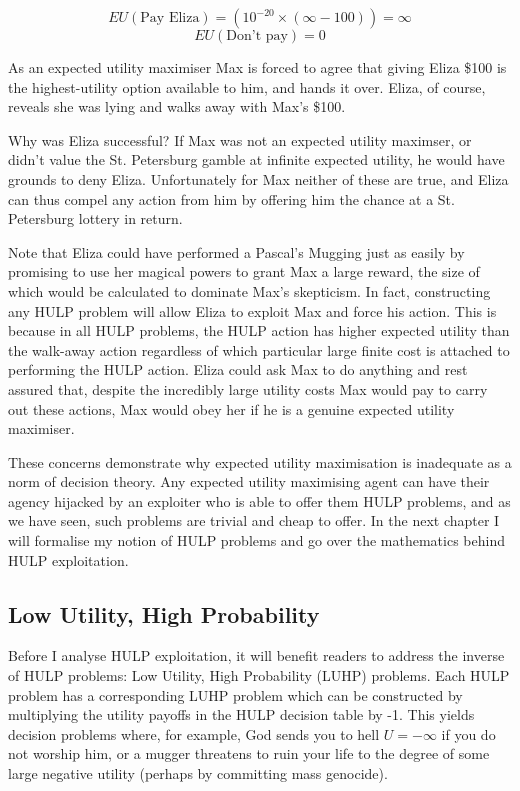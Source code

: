 \documentclass{article}
\begin{document}
\[EU(\mbox{Pay Eliza})=(10^{-20}\times(\infty-100)) = \infty\]
\[EU(\mbox{Don't pay})=0\]

As an expected utility maximiser Max is forced to agree that giving Eliza \$100 is the highest-utility option available to him, and hands it over. Eliza, of course, reveals she was lying and walks away with Max's \$100.

Why was Eliza successful? If Max was not an expected utility maximser, or didn't value the St. Petersburg gamble at infinite expected utility, he would have grounds to deny Eliza. Unfortunately for Max neither of these are true, and Eliza can thus compel any action from him by offering him the chance at a St. Petersburg lottery in return. 

Note that Eliza could have performed a Pascal's Mugging just as easily by promising to use her magical powers to grant Max a large reward, the size of which would be calculated to dominate Max's skepticism. In fact, constructing any HULP problem will allow Eliza to exploit Max and force his action. This is because in all HULP problems, the HULP action has higher expected utility than the walk-away action regardless of which particular large finite cost is attached to performing the HULP action. Eliza could ask Max to do anything and rest assured that, despite the incredibly large utility costs Max would pay to carry out these actions, Max would obey her if he is a genuine expected utility maximiser.

These concerns demonstrate why expected utility maximisation is inadequate as a norm of decision theory. Any expected utility maximising agent can have their agency hijacked by an exploiter who is able to offer them HULP problems, and as we have seen, such problems are trivial and cheap to offer. In the next chapter I will formalise my notion of HULP problems and go over the mathematics behind HULP exploitation.

\subsection{Low Utility, High Probability}

Before I analyse HULP exploitation, it will benefit readers to address the inverse of HULP problems: Low Utility, High Probability (LUHP) problems. Each HULP problem has a corresponding LUHP problem which can be constructed by multiplying the utility payoffs in the HULP decision table by -1. This yields decision problems where, for example, God sends you to hell \(U=-\infty\) if you do not worship him, or a mugger threatens to ruin your life to the degree of some large negative utility (perhaps by committing mass genocide). 
\end{document}
